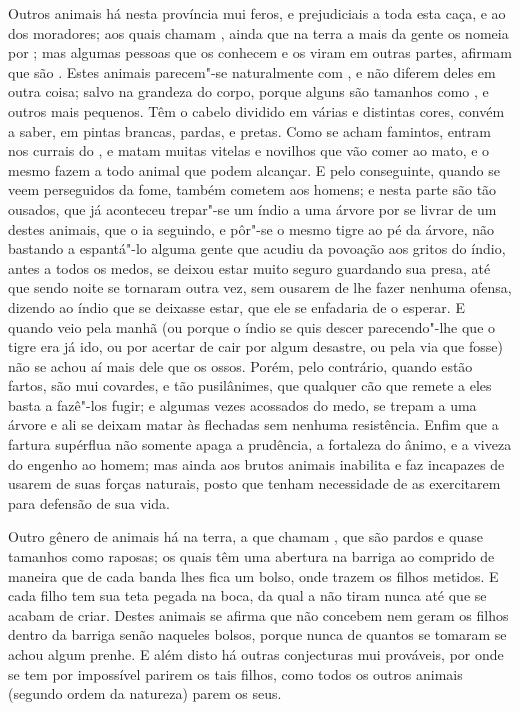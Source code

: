 Outros animais há nesta província mui feros, e prejudiciais a toda esta
caça, e ao  dos moradores; aos quais chamam , ainda que na
terra a mais da gente os nomeia por ; mas algumas pessoas que os
conhecem e os viram em outras partes, afirmam que são . Estes
animais  parecem"-se naturalmente com , e não diferem deles em
outra coisa; salvo na grandeza do corpo, porque alguns são tamanhos
como , e outros mais pequenos. Têm o cabelo dividido em várias
e distintas cores, convém a saber, em pintas brancas, pardas, e pretas.
Como se acham famintos, entram nos currais do , e matam muitas
vitelas e novilhos que vão comer ao mato, e o mesmo fazem a todo animal				%
que podem alcançar. E pelo conseguinte, quando se veem perseguidos da
fome, também cometem aos homens; e nesta parte são tão ousados, que já
aconteceu trepar"-se um índio a uma árvore por se livrar de um destes
animais, que o ia seguindo, e pôr"-se o mesmo tigre ao pé da árvore, não			%
bastando a espantá"-lo alguma gente que acudiu da povoação aos gritos do
índio, antes a todos os medos, se deixou estar muito seguro guardando
sua presa, até que sendo noite se tornaram outra vez, sem ousarem de
lhe fazer nenhuma ofensa, dizendo ao índio que se deixasse estar, que
ele se enfadaria de o esperar. E quando veio pela manhã (ou porque o índio se
quis descer parecendo"-lhe que o tigre era já ido, ou por acertar de cair por			%
algum desastre, ou pela via que fosse) não se achou aí mais dele que os ossos.
Porém, pelo contrário, quando estão fartos, são mui covardes, e tão pusilânimes,
que qualquer cão que remete a eles basta a fazê"-los fugir; e algumas vezes
acossados do medo, se trepam a uma árvore e ali se deixam matar às flechadas sem nenhuma resistência. Enfim que a fartura supérflua
não somente apaga a prudência, a fortaleza do ânimo, e a viveza do engenho ao			%
homem; mas ainda aos brutos animais inabilita e faz incapazes de usarem de suas
forças naturais, posto que tenham necessidade de as exercitarem para defensão de
sua vida.

Outro gênero de animais há na terra, a que chamam , que são
pardos e quase tamanhos como raposas; os quais têm uma abertura na
barriga ao comprido de maneira que de cada banda lhes fica um bolso,
onde trazem os filhos metidos. E cada filho tem sua teta pegada na
boca, da qual a não tiram nunca até que se acabam de criar. Destes
animais se afirma que não concebem nem geram os filhos dentro da barriga
senão naqueles bolsos, porque nunca de quantos se tomaram se achou
algum prenhe. E além disto há outras conjecturas mui prováveis, por
onde se tem por impossível parirem os tais filhos, como todos os outros
animais (segundo ordem da natureza) parem os seus.

